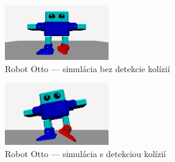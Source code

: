 \begin{figure}
\centerline{\includegraphics[width=0.4\textwidth]{images/otto-without-collision}}
\caption[Robot Otto --- simulácia bez detekcie kolízií]{Robot Otto --- simulácia bez detekcie kolízií}
\label{obr:otto-without-collision}
\end{figure}

\begin{figure}
\centerline{\includegraphics[width=0.4\textwidth]{images/otto-with-collision}}
\caption[Robot Otto --- simulácia s detekciou kolízií]{Robot Otto --- simulácia s detekciou kolízií}
\label{obr:otto-with-collision}
\end{figure}















